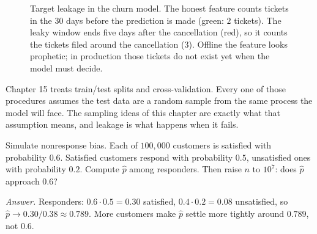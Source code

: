 \begin{figure}[H]
\centering
{}
\caption{Target leakage in the churn model. The honest feature counts tickets in the
$30$ days before the prediction is made (green: $2$ tickets). The leaky window ends five
days after the cancellation (red), so it counts the tickets filed around the cancellation
($3$). Offline the feature looks prophetic; in production those tickets do not
exist yet when the model must decide.}
\label{fig:sampling-leakage}
\end{figure}

\begin{connectionbox}
Chapter 15 treats train/test splits and cross-validation. Every one of those procedures
assumes the test data are a random sample from the same process the model will face. The
sampling ideas of this chapter are exactly what that assumption means, and leakage is
what happens when it fails.
\end{connectionbox}

\begin{labbox}
Simulate nonresponse bias. Each of $100{,}000$ customers is satisfied with probability
$0.6$. Satisfied customers respond with probability $0.5$, unsatisfied ones with
probability $0.2$. Compute $\hat p$ among responders. Then raise $n$ to $10^7$: does
$\hat p$ approach $0.6$?

\textit{Answer.} Responders: $0.6\cdot 0.5 = 0.30$ satisfied, $0.4\cdot 0.2 = 0.08$
unsatisfied, so $\hat p \to 0.30/0.38 \approx 0.789$. More customers make $\hat p$
settle more tightly around $0.789$, not $0.6$.
\end{labbox}

